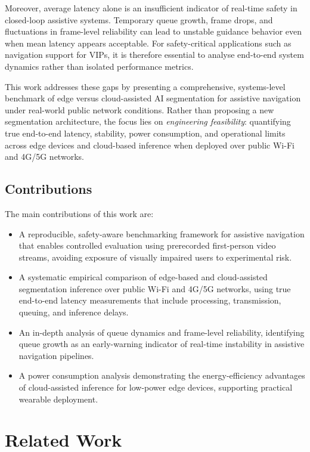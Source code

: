 \documentclass{ieeeaccess}
\begin{document}
Moreover, average latency alone is an insufficient indicator of real-time safety in closed-loop assistive systems. Temporary queue growth, frame drops, and fluctuations in frame-level reliability can lead to unstable guidance behavior even when mean latency appears acceptable. For safety-critical applications such as navigation support for VIPs, it is therefore essential to analyse end-to-end system dynamics rather than isolated performance metrics.

This work addresses these gaps by presenting a comprehensive, systems-level benchmark of edge versus cloud-assisted AI segmentation for assistive navigation under real-world public network conditions. Rather than proposing a new segmentation architecture, the focus lies on \emph{engineering feasibility}: quantifying true end-to-end latency, stability, power consumption, and operational limits across edge devices and cloud-based inference when deployed over public Wi-Fi and 4G/5G networks.

\subsection{Contributions}
The main contributions of this work are:
\begin{itemize}
\item A reproducible, safety-aware benchmarking framework for assistive navigation that enables controlled evaluation using prerecorded first-person video streams, avoiding exposure of visually impaired users to experimental risk.
\item  A systematic empirical comparison of edge-based and cloud-assisted segmentation inference over public Wi-Fi and 4G/5G networks, using true end-to-end latency measurements that include processing, transmission, queuing, and inference delays.
\item  An in-depth analysis of queue dynamics and frame-level reliability, identifying queue growth as an early-warning indicator of real-time instability in assistive navigation pipelines.
\item  A power consumption analysis demonstrating the energy-efficiency advantages of cloud-assisted inference for low-power edge devices, supporting practical wearable deployment.
\end{itemize}

\section{Related Work}
\end{document}
